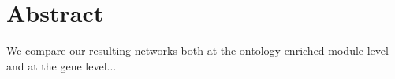 \documentclass[10pt,letterpaper]{article}
\begin{document}
\section*{Abstract}
We compare our resulting networks both at the ontology enriched module level and at the gene level...



\linenumbers
\end{document}
